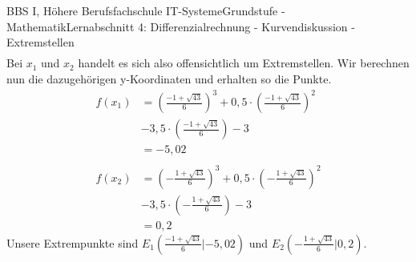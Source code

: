 \documentclass[11pt,twocolumn,oneside,openany,headings=optiontotoc,11pt,numbers=noenddot]{article}
\begin{document}
\begin{worksheet}{BBS I, Höhere Berufsfachschule IT-Systeme}{Grundstufe - Mathematik}{Lernabschnitt 4: Differenzialrechnung - Kurvendiskussion - Extremstellen}
\begin{align*}
		\end{align*}
		Bei \(x_1\) und \(x_2\) handelt es sich also offensichtlich um Extremstellen. Wir berechnen nun die dazugehörigen y-Koordinaten und erhalten so die Punkte.\\
		\begin{align*}
			f(x_1) & = (\frac{-1+\sqrt{43}}{6})^3 + 0,5\cdot\left(\frac{-1+\sqrt{43}}{6}\right)^2\\
			& -3,5\cdot\left(\frac{-1+\sqrt{43}}{6}\right) -3\\
			& = -5,02\\
			\\
			f(x_2) & = (-\frac{1+\sqrt{43}}{6})^3 + 0,5\cdot\left(-\frac{1+\sqrt{43}}{6}\right)^2\\
			& -3,5\cdot\left(-\frac{1+\sqrt{43}}{6}\right) -3\\
			& = 0,2
		\end{align*}
		Unsere Extrempunkte sind \(E_1(\frac{-1+\sqrt{43}}{6}|-5,02)\) und \(E_2(-\frac{1+\sqrt{43}}{6}|0,2)\).\\
	\end{worksheet}
\end{document}
